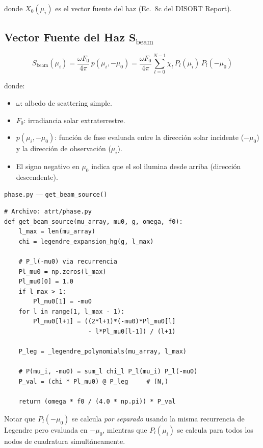 \documentclass[a4paper,11pt]{article}
\begin{document}
donde $X_0(\mu_i)$ es el vector fuente del haz (Ec.\ 8c del DISORT Report).

\subsection{Vector Fuente del Haz $\mathbf{S}_{\text{beam}}$}

\begin{equation}
\boxed{S_{\text{beam}}(\mu_i) = \frac{\omega F_0}{4\pi} \, p(\mu_i, -\mu_0) = \frac{\omega F_0}{4\pi} \sum_{l=0}^{N-1} \chi_l \, P_l(\mu_i) \, P_l(-\mu_0)}
\label{eq:beam_source}
\end{equation}

donde:
\begin{itemize}
\item $\omega$: albedo de scattering simple.
\item $F_0$: irradiancia solar extraterrestre.
\item $p(\mu_i, -\mu_0)$: funci\'on de fase evaluada entre la direcci\'on solar incidente ($-\mu_0$) y la direcci\'on de observaci\'on ($\mu_i$).
\item El signo negativo en $\mu_0$ indica que el sol ilumina desde arriba (direcci\'on descendente).
\end{itemize}

\begin{implementation}{\texttt{phase.py} --- \texttt{get\_beam\_source()}}
\begin{lstlisting}
# Archivo: atrt/phase.py
def get_beam_source(mu_array, mu0, g, omega, f0):
    l_max = len(mu_array)
    chi = legendre_expansion_hg(g, l_max)

    # P_l(-mu0) via recurrencia
    Pl_mu0 = np.zeros(l_max)
    Pl_mu0[0] = 1.0
    if l_max > 1:
        Pl_mu0[1] = -mu0
    for l in range(1, l_max - 1):
        Pl_mu0[l+1] = ((2*l+1)*(-mu0)*Pl_mu0[l]
                       - l*Pl_mu0[l-1]) / (l+1)

    P_leg = _legendre_polynomials(mu_array, l_max)

    # P(mu_i, -mu0) = sum_l chi_l P_l(mu_i) P_l(-mu0)
    P_val = (chi * Pl_mu0) @ P_leg     # (N,)

    return (omega * f0 / (4.0 * np.pi)) * P_val
\end{lstlisting}
Notar que $P_l(-\mu_0)$ se calcula \textit{por separado} usando la misma recurrencia de Legendre pero evaluada en $-\mu_0$, mientras que $P_l(\mu_i)$ se calcula para todos los nodos de cuadratura simult\'aneamente.
\end{implementation}
\end{document}
